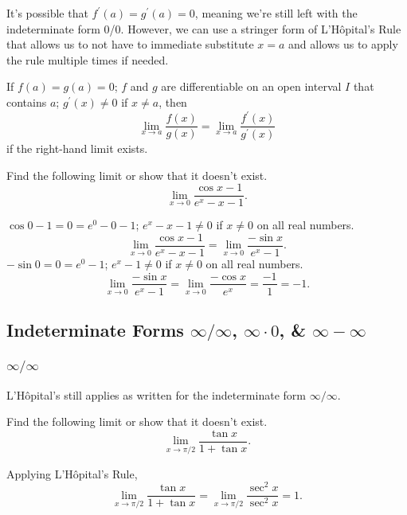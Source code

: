 \noindent
It's possible that $f^\prime(a) = g^\prime(a) = 0$, meaning we're still left with the indeterminate form 0/0.
However, we can use a stringer form of L'H\^{o}pital's Rule that allows us to not have to immediate substitute $x=a$ and allows us to apply the rule multiple times if needed.
\begin{theorem}
	If $f(a)=g(a)=0$; $f$ and $g$ are differentiable on an open interval $I$ that contains $a$; $g^\prime(x)\neq 0$ if $x\neq a$, then
	\begin{equation*}
		\lim_{x\to a}{\frac{f(x)}{g(x)}} = \lim_{x\to a}{\frac{f^\prime(x)}{g^\prime(x)}}
	\end{equation*}
	if the right-hand limit exists.
\end{theorem}

\begin{example}
	Find the following limit or show that it doesn't exist.
	\begin{equation*}
		\lim_{x\to 0}{\frac{\cos{x}-1}{e^x - x - 1}}.
	\end{equation*}
\end{example}
$\cos{0}-1 = 0 = e^0 - 0 - 1$; $e^x - x - 1 \neq 0$ if $x\neq 0$ on all real numbers.
\begin{equation*}
	\lim_{x\to 0}{\frac{\cos{x}-1}{e^x - x - 1}} = \lim_{x\to 0}{\frac{-\sin{x}}{e^x - 1}}.
\end{equation*}
\indent
$-\sin{0} = 0 = e^0 - 1$; $e^x - 1 \neq 0$ if $x\neq 0$ on all real numbers.
\begin{equation*}
	\lim_{x\to 0}{\frac{-\sin{x}}{e^x - 1}} = \lim_{x\to 0}{\frac{-\cos{x}}{e^x}} = \frac{-1}{1} = -1.
\end{equation*}

\subsection{Indeterminate Forms $\infty/\infty$, $\infty\cdot 0$, \& $\infty - \infty$}
\subsubsection{$\infty/\infty$}
L'H\^{o}pital's still applies as written for the indeterminate form $\infty/\infty$.

\begin{example}
	Find the following limit or show that it doesn't exist.
	\begin{equation*}
		\lim_{x\to\pi/2}\frac{\tan{x}}{1+\tan{x}}.
	\end{equation*}
\end{example}
Applying L'H\^{o}pital's Rule,
\begin{equation*}
	\lim_{x\to\pi/2}{\frac{\tan{x}}{1+\tan{x}}} = \lim_{x\to\pi/2}\frac{\sec^2{x}}{\sec^2{x}} = 1.
\end{equation*}

